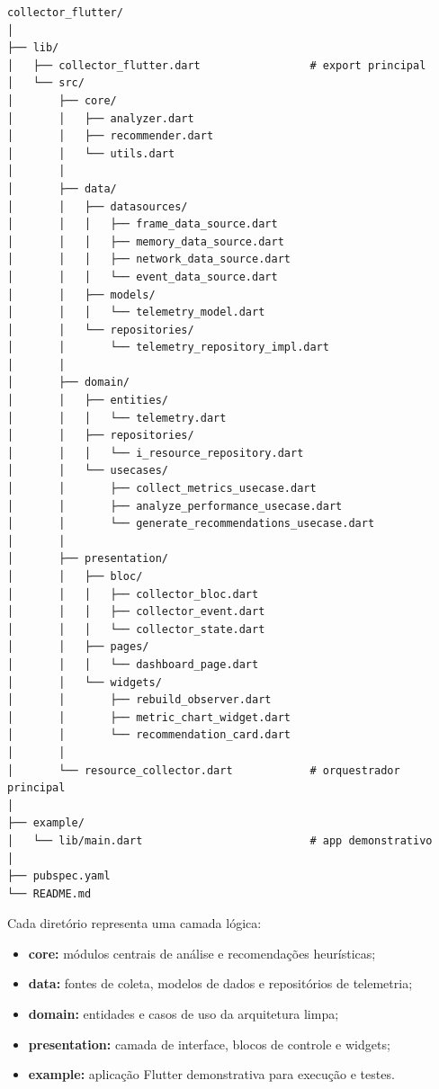 \documentclass[12pt,a4paper,oneside]{abntex2}
\begin{document}
\begin{verbatim}
collector_flutter/
│
├── lib/
│   ├── collector_flutter.dart                 # export principal
│   └── src/
│       ├── core/
│       │   ├── analyzer.dart
│       │   ├── recommender.dart
│       │   └── utils.dart
│       │
│       ├── data/
│       │   ├── datasources/
│       │   │   ├── frame_data_source.dart
│       │   │   ├── memory_data_source.dart
│       │   │   ├── network_data_source.dart
│       │   │   └── event_data_source.dart
│       │   ├── models/
│       │   │   └── telemetry_model.dart
│       │   └── repositories/
│       │       └── telemetry_repository_impl.dart
│       │
│       ├── domain/
│       │   ├── entities/
│       │   │   └── telemetry.dart
│       │   ├── repositories/
│       │   │   └── i_resource_repository.dart
│       │   └── usecases/
│       │       ├── collect_metrics_usecase.dart
│       │       ├── analyze_performance_usecase.dart
│       │       └── generate_recommendations_usecase.dart
│       │
│       ├── presentation/
│       │   ├── bloc/
│       │   │   ├── collector_bloc.dart
│       │   │   ├── collector_event.dart
│       │   │   └── collector_state.dart
│       │   ├── pages/
│       │   │   └── dashboard_page.dart
│       │   └── widgets/
│       │       ├── rebuild_observer.dart
│       │       ├── metric_chart_widget.dart
│       │       └── recommendation_card.dart
│       │
│       └── resource_collector.dart            # orquestrador principal
│
├── example/
│   └── lib/main.dart                          # app demonstrativo
│
├── pubspec.yaml
└── README.md
\end{verbatim}

Cada diretório representa uma camada lógica:
\begin{itemize}
  \item \textbf{core:} módulos centrais de análise e recomendações heurísticas;
  \item \textbf{data:} fontes de coleta, modelos de dados e repositórios de telemetria;
  \item \textbf{domain:} entidades e casos de uso da arquitetura limpa;
  \item \textbf{presentation:} camada de interface, blocos de controle e widgets;
  \item \textbf{example:} aplicação Flutter demonstrativa para execução e testes.
\end{itemize}
\end{document}
